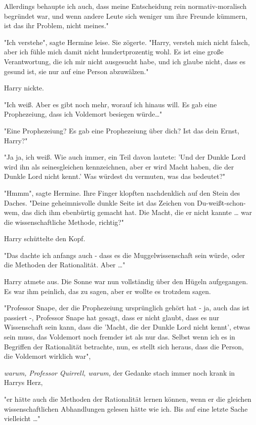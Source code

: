 {Allerdings behaupte ich auch, dass meine Entscheidung rein normativ-moralisch begründet war, und wenn andere Leute sich weniger um ihre Freunde kümmern, ist das ihr Problem, nicht meines."

"Ich verstehe", sagte Hermine leise. Sie zögerte. "Harry, versteh mich nicht falsch, aber ich fühle mich damit nicht hundertprozentig wohl. Es ist eine große Verantwortung, die ich mir nicht ausgesucht habe, und ich glaube nicht, dass es gesund ist, sie nur auf eine Person abzuwälzen."

Harry nickte.

"Ich weiß. Aber es gibt noch mehr, worauf ich hinaus will. Es gab eine Prophezeiung, dass ich Voldemort besiegen würde…"

"Eine Prophezeiung? Es gab eine Prophezeiung über dich? Ist das dein Ernst, Harry?"

"Ja ja, ich weiß. Wie auch immer, ein Teil davon lautete: 'Und der Dunkle Lord wird ihn als seinesgleichen kennzeichnen, aber er wird Macht haben, die der Dunkle Lord nicht kennt.' Was würdest du vermuten, was das bedeutet?"

"Hmmm", sagte Hermine. Ihre Finger klopften nachdenklich auf den Stein des Daches. "Deine geheimnisvolle dunkle Seite ist das Zeichen von Du-weißt-schon-wem, das dich ihm ebenbürtig gemacht hat. Die Macht, die er nicht kannte … war die wissenschaftliche Methode, richtig?"

Harry schüttelte den Kopf.

"Das dachte ich anfangs auch - dass es die Muggelwissenschaft sein würde, oder die Methoden der Rationalität. Aber …"

Harry atmete aus. Die Sonne war nun vollständig über den Hügeln aufgegangen. Es war ihm peinlich, das zu sagen, aber er wollte es trotzdem sagen.

"Professor Snape, der die Prophezeiung ursprünglich gehört hat - ja, auch das ist passiert -, Professor Snape hat gesagt, dass er nicht glaubt, dass es nur Wissenschaft sein kann, dass die 'Macht, die der Dunkle Lord nicht kennt', etwas sein muss, das Voldemort noch fremder ist als nur das. Selbst wenn ich es in Begriffen der Rationalität betrachte, nun, es stellt sich heraus, dass die Person, die Voldemort wirklich war",

\emph{warum, Professor Quirrell, warum,} der Gedanke stach immer noch krank in Harrys Herz,

"er hätte auch die Methoden der Rationalität lernen können, wenn er die gleichen wissenschaftlichen Abhandlungen gelesen hätte wie ich. Bis auf eine letzte Sache vielleicht …"

}
